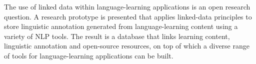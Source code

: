 The use of linked data within language-learning applications is an open research question. A research prototype is presented that applies linked-data principles to store linguistic annotation generated from language-learning content using a variety of NLP tools. The result is a database that links learning content, linguistic annotation and open-source resources, on top of which a diverse range of tools for language-learning applications can be built.
